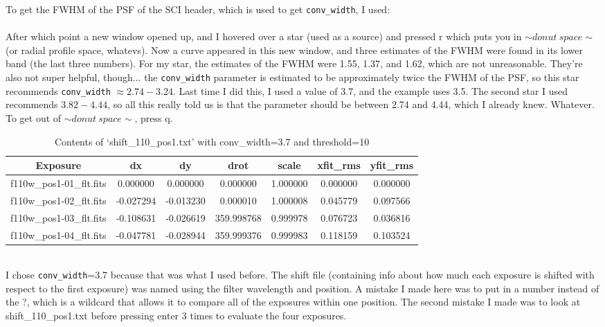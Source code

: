 \documentclass[11pt,obeyspaces]{article} %
\begin{document}
To get the FWHM of the PSF of the SCI header, which is used to get {\tt conv\_width}, I used:\\
\\
After which point a new window opened up, and I hovered over a star (used as a source) and pressed r which puts you in $\sim donut~space \sim$ (or radial profile space, whatevs). Now a curve appeared in this new window, and three estimates of the FWHM were found in its lower band (the last three numbers). For my star, the estimates of the FWHM were 1.55, 1.37, and 1.62, which are not unreasonable. They're also not super helpful, though... the {\tt conv\_width} parameter is estimated to be approximately twice the FWHM of the PSF, so this star recommends {\tt conv\_width} $\approx 2.74 - 3.24$. Last time I did this, I used a value of 3.7, and the example uses 3.5. The second star I used recommends $3.82-4.44$, so all this really told us is that the parameter should be between 2.74 and 4.44, which I already knew. Whatever. To get out of $\sim donut~space \sim$, press q. \\

\begin{table}[b]
\caption{Contents of `shift\_110\_pos1.txt' with conv\_width=3.7 and threshold=10}
\begin{center}
\begin{tabular}{|c|c|c|c|c|c|c|} \hline
Exposure & dx & dy & drot & scale & xfit\_rms & yfit\_rms \\ \hline
f110w\_pos1-01\_flt.fits & 0.000000 & 0.000000 & 0.000000 & 1.000000 & 0.000000 & 0.000000  \\
f110w\_pos1-02\_flt.fits & -0.027294 & -0.013230 & 0.000010 & 1.000008 & 0.045779 & 0.097566 \\
f110w\_pos1-03\_flt.fits & -0.108631 & -0.026619 & 359.998768 & 0.999978 & 0.076723 & 0.036816 \\
f110w\_pos1-04\_flt.fits & -0.047781 & -0.028944 & 359.999376 & 0.999983 & 0.118159 & 0.103524 \\ \hline
\end{tabular}
\end{center}
\label{table:shift}
\end{table}

\\
I chose {\tt conv\_width}=3.7 because that was what I used before. The shift file (containing info about how much each exposure is shifted with respect to the first exposure) was named using the filter wavelength and position. A mistake I made here was to put in a number instead of the ?, which is a wildcard that allows it to compare all of the exposures within one position. The second mistake I made was to look at shift\_110\_pos1.txt before pressing enter 3 times to evaluate the four exposures. \\
\end{document}
